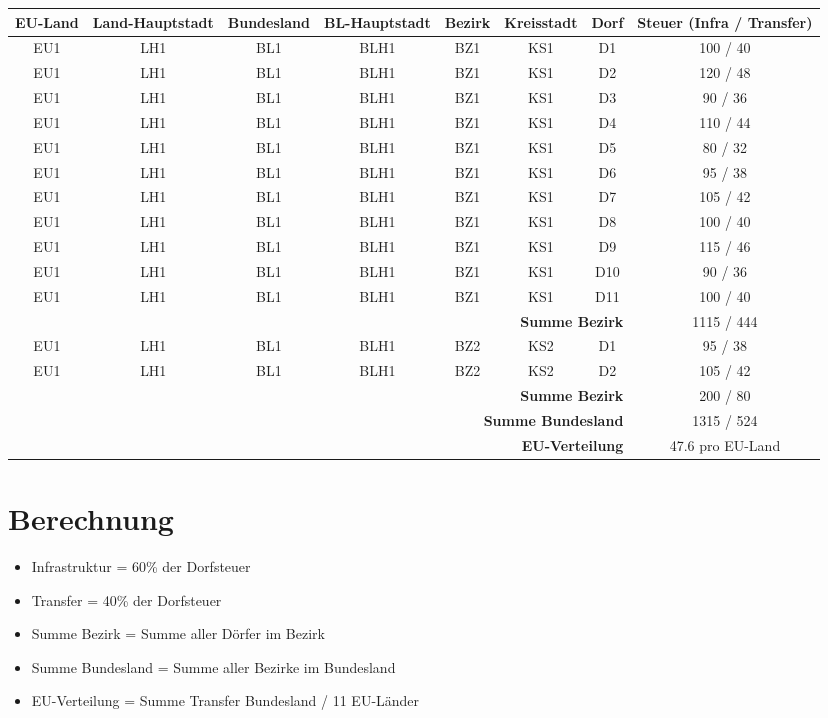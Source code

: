 \documentclass[a4paper,12pt]{article}
\begin{document}
\begin{tabular}{c c c c c c c c}
\toprule
EU-Land & Land-Hauptstadt & Bundesland & BL-Hauptstadt & Bezirk & Kreisstadt & Dorf & Steuer (Infra / Transfer) \\
\midrule
EU1 & LH1 & BL1 & BLH1 & BZ1 & KS1 & D1 & 100 / 40 \\
EU1 & LH1 & BL1 & BLH1 & BZ1 & KS1 & D2 & 120 / 48 \\
EU1 & LH1 & BL1 & BLH1 & BZ1 & KS1 & D3 & 90 / 36 \\
EU1 & LH1 & BL1 & BLH1 & BZ1 & KS1 & D4 & 110 / 44 \\
EU1 & LH1 & BL1 & BLH1 & BZ1 & KS1 & D5 & 80 / 32 \\
EU1 & LH1 & BL1 & BLH1 & BZ1 & KS1 & D6 & 95 / 38 \\
EU1 & LH1 & BL1 & BLH1 & BZ1 & KS1 & D7 & 105 / 42 \\
EU1 & LH1 & BL1 & BLH1 & BZ1 & KS1 & D8 & 100 / 40 \\
EU1 & LH1 & BL1 & BLH1 & BZ1 & KS1 & D9 & 115 / 46 \\
EU1 & LH1 & BL1 & BLH1 & BZ1 & KS1 & D10 & 90 / 36 \\
EU1 & LH1 & BL1 & BLH1 & BZ1 & KS1 & D11 & 100 / 40 \\
\midrule
\multicolumn{7}{r}{\textbf{Summe Bezirk}} & 1115 / 444 \\
\midrule
EU1 & LH1 & BL1 & BLH1 & BZ2 & KS2 & D1 & 95 / 38 \\
EU1 & LH1 & BL1 & BLH1 & BZ2 & KS2 & D2 & 105 / 42 \\
\multicolumn{7}{r}{\textbf{Summe Bezirk}} & 200 / 80 \\
\midrule
\multicolumn{7}{r}{\textbf{Summe Bundesland}} & 1315 / 524 \\
\midrule
\multicolumn{7}{r}{\textbf{EU-Verteilung}} & 47.6 pro EU-Land \\
\bottomrule
\end{tabular}

\section{Berechnung}

\begin{itemize}
\item Infrastruktur = 60\% der Dorfsteuer  
\item Transfer = 40\% der Dorfsteuer  
\item Summe Bezirk = Summe aller Dörfer im Bezirk  
\item Summe Bundesland = Summe aller Bezirke im Bundesland  
\item EU-Verteilung = Summe Transfer Bundesland / 11 EU-Länder
\end{itemize}
\end{document}

